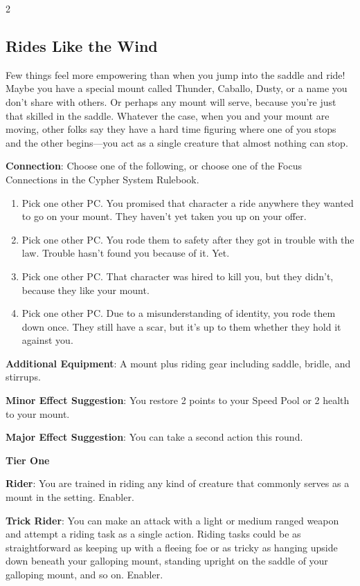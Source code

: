 \begin{multicols}{2}
\subsection{Rides Like the Wind}

Few things feel more empowering than when you jump into the saddle and ride! Maybe you have a special mount called Thunder, Caballo, Dusty, or a name you don’t share with others. Or perhaps any mount will serve, because you’re just that skilled in the saddle. Whatever the case, when you and your mount are moving, other folks say they have a hard time figuring where one of you stops and the other begins—you act as a single creature that almost nothing can stop.

\textbf{Connection}: Choose one of the following, or choose one of the Focus Connections in the Cypher System Rulebook. 
\begin{enumerate}
\item Pick one other PC. You promised that character a ride anywhere they wanted to go on your mount. They haven’t yet taken you up on your offer. 
\item Pick one other PC. You rode them to safety after they got in trouble with the law. Trouble hasn’t found you because of it. Yet. 
\item Pick one other PC. That character was hired to kill you, but they didn’t, because they like your mount. 
\item Pick one other PC. Due to a misunderstanding of identity, you rode them down once. They still have a scar, but it’s up to them whether they hold it against you. 
\end{enumerate}

\textbf{Additional Equipment}: A mount plus riding gear including saddle, bridle, and stirrups. 

\textbf{Minor Effect Suggestion}: You restore 2 points to your Speed Pool or 2 health to your mount. 

\textbf{Major Effect Suggestion}: You can take a second action this round.

\textbf{Tier One}
 
\textbf{Rider}: You are trained in riding any kind of creature that commonly serves as a mount in the setting. Enabler. 

\textbf{Trick Rider}: You can make an attack with a light or medium ranged weapon and attempt a riding task as a single action. Riding tasks could be as straightforward as keeping up with a fleeing foe or as tricky as hanging upside down beneath your galloping mount, standing upright on the saddle of your galloping mount, and so on. Enabler. 


\end{multicols}
